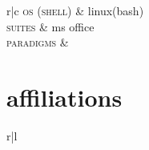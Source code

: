 \documentclass[12pt]{article}
\newcommand{\tableentry}[3]{\textsc{#1} & #2\expandafter\ifstrequal\expandafter{#3}{}{\\}{\\[6pt]}}
\begin{document}
\begin{paracol}{2}
\begin{supertabular}{r|c}
  \tableentry{\footnotesize os (shell)}{\footnotesize linux(bash)}{}

  \tableentry{\footnotesize suites}{\footnotesize  ms office}{}
    

  \tableentry{\footnotesize paradigms}{\footnotesize}{}

\end{supertabular}


\section{affiliations}

\begin{supertabular}{r|l}

\end{supertabular}

\switchcolumn     %



\end{paracol}

\vspace*{\fill}
\end{document}
